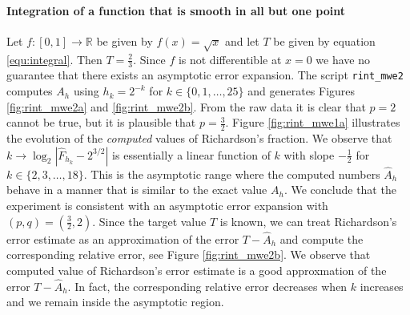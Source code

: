 \documentclass[runningheads]{llncs}
\begin{document}
\paragraph{Integration of a function that is smooth in all but one point}

Let $f : [0,1] \rightarrow \mathbb{R}$ be given by $f(x) = \sqrt{x}$ and let $T$ be given by equation \eqref{equ:integral}.
Then $T = \frac{2}{3}$. Since $f$ is not differentible at $x=0$ we have no guarantee that there exists an asymptotic error expansion.
The script {\tt rint\_mwe2} computes $A_h$ using $h_k = 2^{-k}$ for $k \in \{0,1,\dots,25\}$ and generates Figures \ref{fig:rint_mwe2a} and \ref{fig:rint_mwe2b}.
From the raw data it is clear that $p = 2$ cannot be true, but it is plausible that $p = \frac{3}{2}$.
Figure \ref{fig:rint_mwe1a} illustrates the evolution of the \emph{computed} values of Richardson's fraction.
We observe that $k \rightarrow \log_2|\hat{F}_{h_k} - 2^{3/2}|$ is essentially a linear function of $k$ with slope $-\frac{1}{2}$ for $k \in \{2,3,\dots,18\}$.
This is the asymptotic range where the computed numbers $\hat{A}_h$ behave in a manner that is similar to the exact value $A_h$. 
We conclude that the experiment is consistent with an asymptotic error expansion with $(p,q)=(\tfrac{3}{2},2)$.
Since the target value $T$ is known, we can treat Richardson's error estimate as an approximation of the error $T-\hat{A}_h$ and compute the corresponding relative error, see Figure \ref{fig:rint_mwe2b}.
We observe that computed value of Richardson's error estimate is a good approxmation of the error $T - \hat{A}_h$.
In fact, the corresponding relative error decreases when $k$ increases and we remain inside the asymptotic region.
\end{document}

